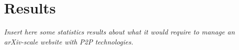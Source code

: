 \section{Results}

\textit{Insert here some statistics results about what
it would require to manage an arXiv-scale website with P2P technologies.}


